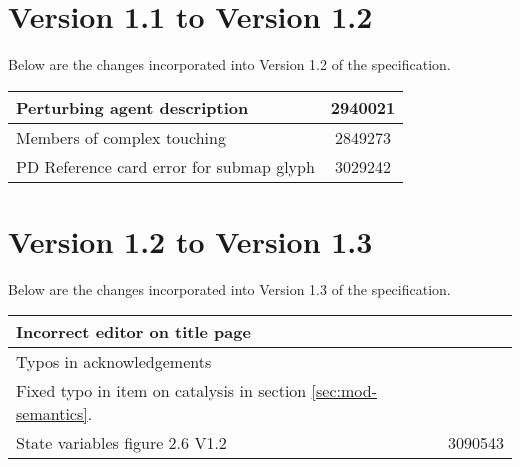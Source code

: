 \section{Version 1.1 to Version 1.2}

Below are the changes incorporated into Version 1.2 of the \SBGNPDLone specification.

\begin{center}
\label{tab:revision history 1.2}
\tablelasttail{\hline}
\begin{supertabular}{|p{12cm}|c|}\hline
Perturbing agent description & 2940021 \\\hline
Members of complex touching & 2849273 \\\hline
PD Reference card error for submap glyph & 3029242 \\\hline
\end{supertabular}
\end{center}

\section{Version 1.2 to Version 1.3}

Below are the changes incorporated into Version 1.3 of the \SBGNPDLone specification.

\begin{center}
\label{tab:revision history 1.3}
\tablelasttail{\hline}
\begin{supertabular}{|p{12cm}|c|}\hline
Incorrect editor on title page & \\\hline
Typos in acknowledgements & \\\hline
Fixed typo in item on catalysis in section \ref{sec:mod-semantics}. & \\\hline
State variables figure 2.6 V1.2 & 3090543 \\\hline\end{supertabular}
\end{center}

